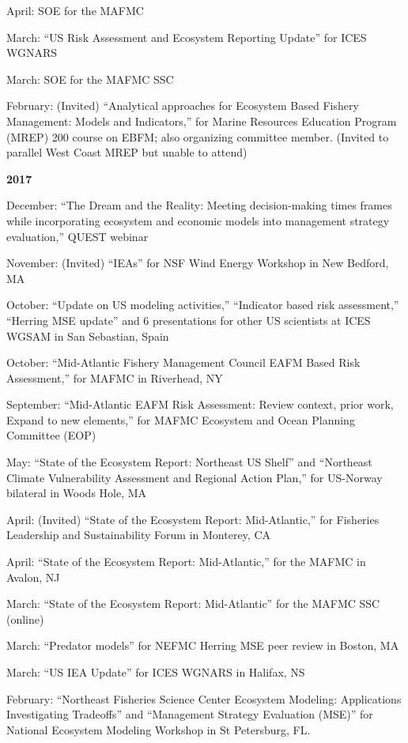 \documentclass[11pt, a4paper]{awesome-cv}
\begin{document}
April: SOE for the MAFMC

March: ``US Risk Assessment and Ecosystem Reporting Update'' for ICES
WGNARS

March: SOE for the MAFMC SSC

February: (Invited) ``Analytical approaches for Ecosystem Based Fishery
Management: Models and Indicators,'' for Marine Resources Education
Program (MREP) 200 course on EBFM; also organizing committee member.
(Invited to parallel West Coast MREP but unable to attend)

\textbf{2017}

December: ``The Dream and the Reality: Meeting decision-making times
frames while incorporating ecosystem and economic models into management
strategy evaluation,'' QUEST webinar

November: (Invited) ``IEAs'' for NSF Wind Energy Workshop in New
Bedford, MA

October: ``Update on US modeling activities,'' ``Indicator based risk
assessment,'' ``Herring MSE update'' and 6 presentations for other US
scientists at ICES WGSAM in San Sebastian, Spain

October: ``Mid-Atlantic Fishery Management Council EAFM Based Risk
Assessment,'' for MAFMC in Riverhead, NY

September: ``Mid-Atlantic EAFM Risk Assessment: Review context, prior
work, Expand to new elements,'' for MAFMC Ecosystem and Ocean Planning
Committee (EOP)

May: ``State of the Ecosystem Report: Northeast US Shelf'' and
``Northeast Climate Vulnerability Assessment and Regional Action Plan,''
for US-Norway bilateral in Woods Hole, MA

April: (Invited) ``State of the Ecosystem Report: Mid-Atlantic,'' for
Fisheries Leadership and Sustainability Forum in Monterey, CA

April: ``State of the Ecosystem Report: Mid-Atlantic,'' for the MAFMC in
Avalon, NJ

March: ``State of the Ecosystem Report: Mid-Atlantic'' for the MAFMC SSC
(online)

March: ``Predator models'' for NEFMC Herring MSE peer review in Boston,
MA

March: ``US IEA Update'' for ICES WGNARS in Halifax, NS

February: ``Northeast Fisheries Science Center Ecosystem Modeling:
Applications Investigating Tradeoffs'' and ``Management Strategy
Evaluation (MSE)'' for National Ecosystem Modeling Workshop in St
Petersburg, FL.
\end{document}
